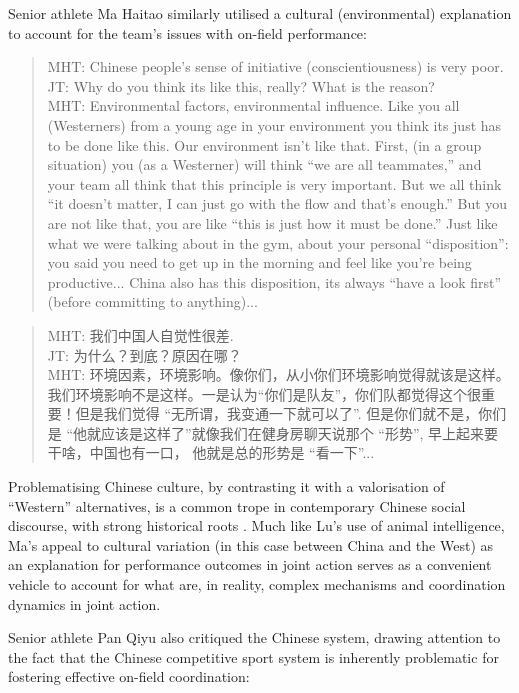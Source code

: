 \begin{CJK}{UTF8}{gbsn}
Senior athlete Ma Haitao similarly utilised a cultural (environmental) explanation to account for the team's issues with on-field performance:

\begin{quotation}
  MHT: Chinese people's sense of initiative (conscientiousness) is very poor.\\
  JT: Why do you think its like this, really? What is the reason? \\ MHT: Environmental factors, environmental influence.  Like you all (Westerners) from a young age in your environment you think its just has to be done like this.  Our environment isn’t like that.  First, (in a group situation) you (as a Westerner) will think ``we are all teammates,'' and your team all think that this principle is very important.  But we all think ``it doesn’t matter, I can just go with the flow and that’s enough.''  But you are not like that, you are like ``this is just how it must be done.'' Just like what we were talking about in the gym, about your personal ``disposition'': you said you need to get up in the morning and feel like you're being productive... China also has this disposition, its always ``have a look first'' (before committing to anything)...
\end{quotation}

\begin{quotation}
  MHT: 我们中国人自觉性很差. \\
  JT: 为什么？到底？原因在哪？\\
  MHT: 环境因素，环境影响。像你们，从小你们环境影响觉得就该是这样。我们环境影响不是这样。一是认为``你们是队友''，你们队都觉得这个很重要！但是我们觉得 ``无所谓，我变通一下就可以了''. 但是你们就不是，你们是 ``他就应该是这样了''就像我们在健身房聊天说那个 ``形势'', 早上起来要干啥，中国也有一口， 他就是总的形势是  ``看一下''...
\end{quotation}

Problematising Chinese culture, by contrasting it with a valorisation of ``Western'' alternatives, is a common trope in contemporary Chinese social discourse, with strong historical roots \citep{Liu1995a}.  Much like Lu's use of animal intelligence, Ma's appeal to cultural variation (in this case between China and the West) as an explanation for performance outcomes in joint action serves as a convenient vehicle to account for what are, in reality, complex mechanisms and coordination dynamics in joint action.

Senior athlete Pan Qiyu also critiqued the Chinese system, drawing attention to the fact that the Chinese competitive sport system is inherently problematic for fostering effective on-field coordination:


\end{CJK}
